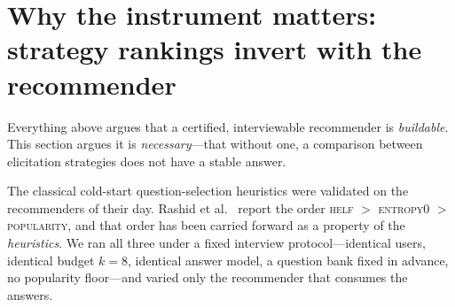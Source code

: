 \documentclass[11pt]{article}
\begin{document}
\section{Why the instrument matters: strategy rankings invert with the recommender}\label{sec:instrdep}

Everything above argues that a certified, interviewable recommender is \emph{buildable}. This section argues it is
\emph{necessary}---that without one, a comparison between elicitation strategies does not have a stable answer.

The classical cold-start question-selection heuristics were validated on the recommenders of their day. Rashid et
al.~\cite{rashid2008learning} report the order \textsc{helf} $>$ \textsc{entropy0} $>$ \textsc{popularity}, and that
order has been carried forward as a property of the \emph{heuristics}. We ran all three under a fixed interview
protocol---identical users, identical budget $k{=}8$, identical answer model, a question bank fixed in advance,
no popularity floor---and varied only the recommender that consumes the answers.
\end{document}
